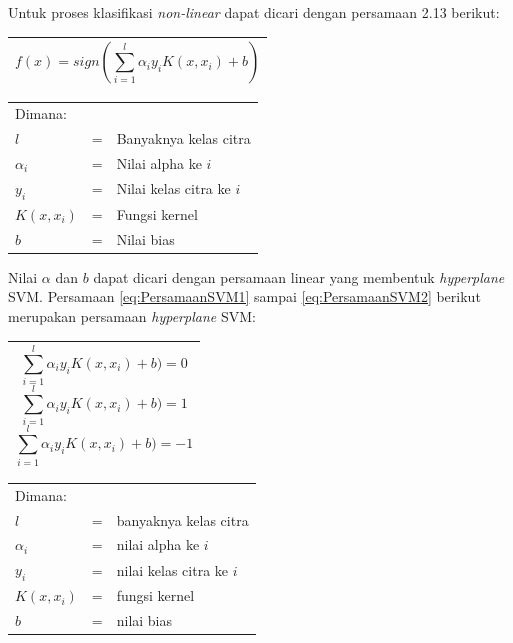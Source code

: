 \noindent Untuk proses klasifikasi \textit{non-linear} dapat dicari dengan persamaan 2.13 berikut:
\begin{table}[H]
	\small
	\begin{adjustbox}{width=1\textwidth}
		\begin{tabular}{|p{13.55cm}|}
			\hline
			\begin{equation}
			f(x) = sign(\sum_{i=1}^{l}\alpha_iy_iK(x,x_i)+b)
			\end{equation}\\
			\hline
		\end{tabular}
	\end{adjustbox}
\end{table}
\noindent
\renewcommand{\arraystretch}{1} 
\begin{tabularx}{\textwidth}{lll}
	Dimana: \\
	$l$ & = & Banyaknya kelas citra\\
	$\alpha_i$ & = & Nilai alpha ke $i$\\
	$y_i$ & = & Nilai kelas citra ke $i$\\
	$K(x,x_i)$ & = & Fungsi kernel\\
	$b$ & = & Nilai bias\\
\end{tabularx}

\noindent Nilai $\alpha$ dan $b$ dapat dicari dengan persamaan linear yang membentuk \textit{hyperplane} SVM. Persamaan \ref{eq:PersamaanSVM1} sampai \ref{eq:PersamaanSVM2} berikut merupakan persamaan \textit{hyperplane} SVM:

\begin{table}[H]
	\small
	\begin{adjustbox}{width=1\textwidth}
		\begin{tabular}{|p{13.55cm}|}
			\hline
			\begin{equation}
			\sum_{i=1}^{l}\alpha_iy_iK(x,x_i)+b)=0
			\label{eq:PersamaanSVM1}
			\end{equation}
			\begin{equation}
			\sum_{i=1}^{l}\alpha_iy_iK(x,x_i)+b)=1
			\end{equation}
			\begin{equation}
			\sum_{i=1}^{l}\alpha_iy_iK(x,x_i)+b)=-1
			\label{eq:PersamaanSVM2}
			\end{equation}\\
			\hline
		\end{tabular}
	\end{adjustbox}
\end{table}
\noindent
\renewcommand{\arraystretch}{1} 
\begin{tabularx}{\textwidth}{lll}
	Dimana: \\
	$l$ & = & banyaknya kelas citra\\
	$\alpha_i$ & = & nilai alpha ke $i$\\
	$y_i$ & = & nilai kelas citra ke $i$\\
	$K(x,x_i)$ & = & fungsi kernel\\
	$b$ & = & nilai bias\\
\end{tabularx}

